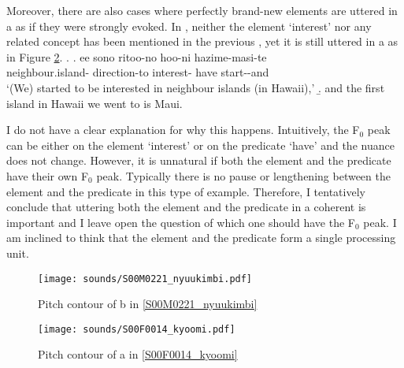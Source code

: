 Moreover,
there are also cases where perfectly brand-new elements are uttered in a  as if they were strongly evoked.
In \Next, neither the element  `interest' nor any related concept has been mentioned in the previous ,
yet it is still uttered in a  as in Figure \ref{S00F0014_kyoomiF}.
%
\ex.\label{S00F0014_kyoomi}
 \ag. ee sono ritoo-no \tp{\dvline} hoo-ni  \tp{\dvline}  hazime-masi-te \tp{\dvline} \\
        neighbour.island- {} direction-to interest- {} have start--and {} \\
      `(We) started to be interested in neighbour islands (in Hawaii),'
 \b. and the first island in Hawaii we went to is Maui.

I do not have a clear explanation for why this happens.
Intuitively, the F$_{0}$ peak can be either on the element  `interest' or on the predicate  `have'
and the nuance does not change.
However, it is unnatural if both the element and the predicate have their own F$_{0}$ peak.
Typically there is no pause or  lengthening between the element and the predicate in this type of example.
Therefore, I tentatively conclude that uttering both the element and the predicate in a coherent  is important and I leave open the question of which one should have the F$_{0}$ peak.
I am inclined to think that the element and the predicate form a single processing unit.

\begin{figure}
	\begin{center}
	\texttt{[image: sounds/S00M0221\_nyuukimbi.pdf]}
	\caption{Pitch contour of b in \ref{S00M0221_nyuukimbi}}
	\label{S00M0221_nyuukimbiF}
	\end{center}
\end{figure}
\begin{figure}
	\begin{center}
	\texttt{[image: sounds/S00F0014\_kyoomi.pdf]}
	\caption{Pitch contour of a in \ref{S00F0014_kyoomi}}
	\label{S00F0014_kyoomiF}
	\end{center}
\end{figure}




